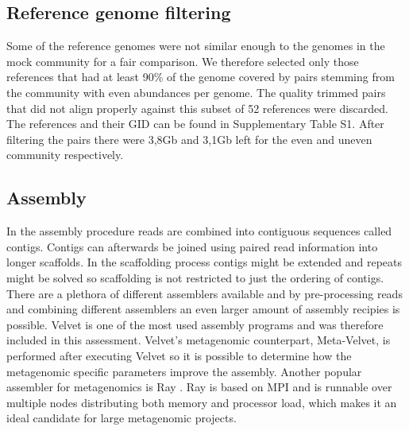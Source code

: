 \subsection*{Reference genome filtering} Some of the reference genomes were not
similar enough to the genomes in the mock community for a fair comparison. We
therefore selected only those references that had at least 90\% of the genome
covered by pairs stemming from the community with even abundances per genome.
The quality trimmed pairs that did not align properly against this subset of 52
references were discarded. The references and their GID can be found in
Supplementary Table S1. After filtering the pairs there were 3,8Gb and 3,1Gb
left for the even and uneven community respectively.



\subsection*{Assembly} In the assembly procedure reads are combined into
contiguous sequences called contigs. Contigs can afterwards be joined using
paired read information into longer scaffolds. In the scaffolding process
contigs might be extended and repeats might be solved so scaffolding is not
restricted to just the ordering of contigs.\\


There are a plethora of different assemblers available and by pre-processing
reads and combining different assemblers an even larger amount of assembly
recipies is possible. Velvet is one of the most used assembly programs and
was therefore included in this assessment. Velvet's metagenomic counterpart,
Meta-Velvet, is performed after executing Velvet so it is possible to determine
how the metagenomic specific parameters improve the assembly. Another popular
assembler for metagenomics is Ray \cite{Boisvert23259615}. Ray is based on MPI
and is runnable over multiple nodes distributing both memory and processor
load, which makes it an ideal candidate for large metagenomic projects.\\


